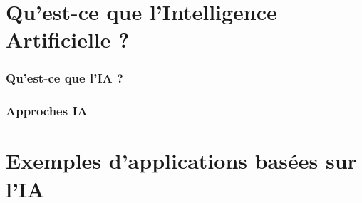 \localized

\tableofcontentslide[onlyparts]

%
%
%
%


\begin{bibliographysection}

\part[subtitle={Concepts et modèles clés de l'IA dans les applications modernes}]{Qu'est-ce que l'Intelligence Artificielle ?}

\section{Qu'est-ce que l'IA ?}
\localized
\localized
\section{Approches IA}
\localized
\localized

\part[subtitle={Principalement issus des projets du laboratoire CIAD}]{Exemples d'applications basées sur l'IA}

\localized
\localized
\localized
\localized
\localized


\end{bibliographysection}
